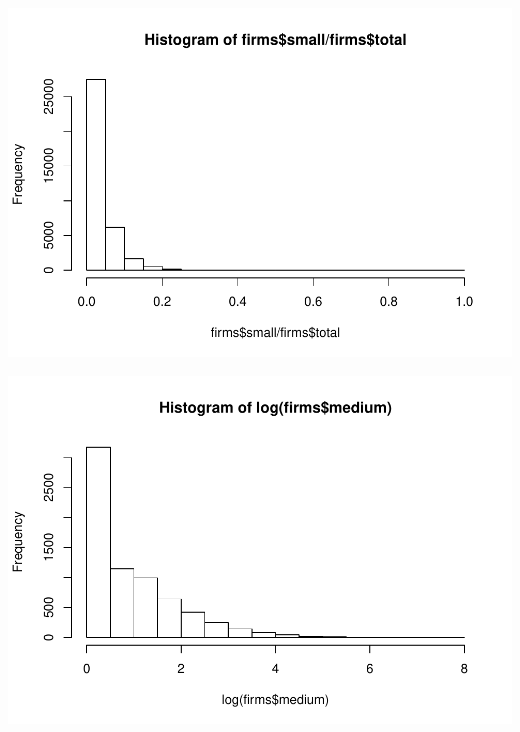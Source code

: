 \documentclass[]{article}
\newenvironment{Shaded}{\begin{snugshade}}{\end{snugshade}}
\newcommand{\KeywordTok}[1]{\textcolor[rgb]{0.13,0.29,0.53}{\textbf{#1}}}
\newcommand{\OperatorTok}[1]{\textcolor[rgb]{0.81,0.36,0.00}{\textbf{#1}}}
\newcommand{\NormalTok}[1]{#1}
\begin{document}
\begin{Shaded}
\end{Shaded}

\includegraphics{TSLproject_files/figure-latex/unnamed-chunk-7-7.pdf}

\begin{Shaded}
\end{Shaded}

\includegraphics{TSLproject_files/figure-latex/unnamed-chunk-7-8.pdf}
\end{document}
